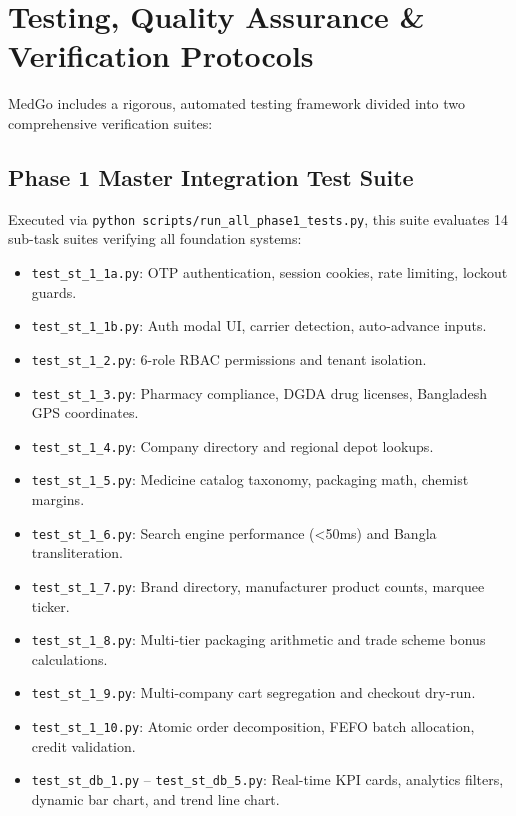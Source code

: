 \documentclass[10pt,a4paper]{article}
\begin{document}
\section{Testing, Quality Assurance \& Verification Protocols}
MedGo includes a rigorous, automated testing framework divided into two comprehensive verification suites:

\subsection{Phase 1 Master Integration Test Suite}
Executed via \texttt{python scripts/run\_all\_phase1\_tests.py}, this suite evaluates 14 sub-task suites verifying all foundation systems:
\begin{itemize}[leftmargin=*]
    \item \texttt{test\_st\_1\_1a.py}: OTP authentication, session cookies, rate limiting, lockout guards.
    \item \texttt{test\_st\_1\_1b.py}: Auth modal UI, carrier detection, auto-advance inputs.
    \item \texttt{test\_st\_1\_2.py}: 6-role RBAC permissions and tenant isolation.
    \item \texttt{test\_st\_1\_3.py}: Pharmacy compliance, DGDA drug licenses, Bangladesh GPS coordinates.
    \item \texttt{test\_st\_1\_4.py}: Company directory and regional depot lookups.
    \item \texttt{test\_st\_1\_5.py}: Medicine catalog taxonomy, packaging math, chemist margins.
    \item \texttt{test\_st\_1\_6.py}: Search engine performance (<50ms) and Bangla transliteration.
    \item \texttt{test\_st\_1\_7.py}: Brand directory, manufacturer product counts, marquee ticker.
    \item \texttt{test\_st\_1\_8.py}: Multi-tier packaging arithmetic and trade scheme bonus calculations.
    \item \texttt{test\_st\_1\_9.py}: Multi-company cart segregation and checkout dry-run.
    \item \texttt{test\_st\_1\_10.py}: Atomic order decomposition, FEFO batch allocation, credit validation.
    \item \texttt{test\_st\_db\_1.py} -- \texttt{test\_st\_db\_5.py}: Real-time KPI cards, analytics filters, dynamic bar chart, and trend line chart.
\end{itemize}
\end{document}
